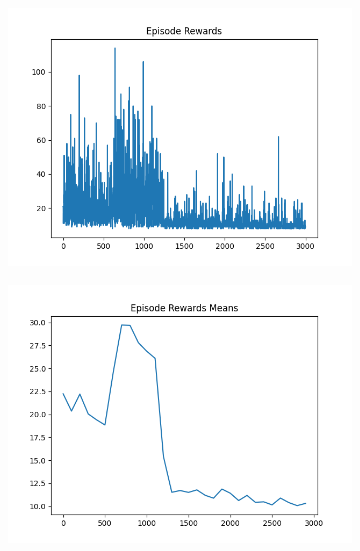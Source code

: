 \begin{figure}[H]
\begin{subfigure}{.47\linewidth}
        \includegraphics[width=\textwidth]{pole/2024-06-13_18-56-41_dqn_cartpole_episode_rewards.png}
    \end{subfigure}
    \begin{subfigure}{.47\linewidth}
        \centering
        \includegraphics[width=\textwidth]{pole/2024-06-13_18-56-41_dqn_cartpole_episode_rewards_means.png}
    \end{subfigure}
\end{figure}
